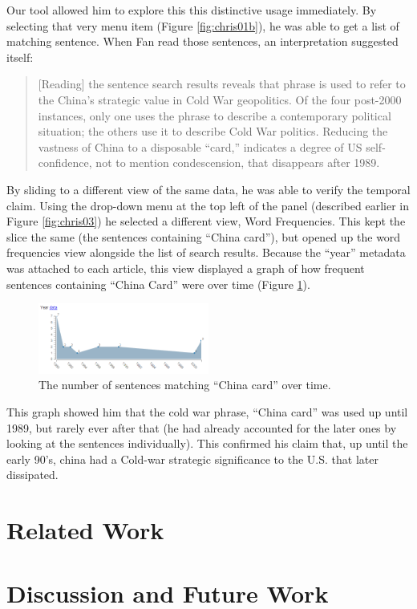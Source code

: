 \documentclass{sig-alternate}
\begin{document}
Our tool allowed him to explore this this distinctive usage immediately. By selecting that very menu item (Figure \ref{fig:chris01b}), he was able to get a list of matching sentence. When Fan read those sentences, an interpretation suggested itself:
\begin{quote}[Reading] the sentence search results reveals that phrase is used to refer to the China's strategic value in Cold War geopolitics. Of the four post-2000 instances, only one uses the phrase to describe a contemporary political situation; the others use it to describe Cold War politics. Reducing the vastness of China to a disposable ``card,'' indicates a degree of US self-confidence, not to mention condescension, that disappears after 1989.\end{quote}
By sliding to a different view of the same data, he was able to verify the temporal claim. Using the drop-down menu at the top left of the panel (described earlier in Figure \ref{fig:chris03}) he selected a different view, Word Frequencies. This kept the slice the same (the sentences containing ``China card''), but opened up the word frequencies view alongside the list of search results.  Because the ``year'' metadata was attached to each article, this view displayed a graph of how frequent  sentences containing ``China Card'' were over time (Figure \ref{fig:chris02}). 

\begin{figure}[h!]
\includegraphics[width=0.5\textwidth]{fig/chris/02.png}
\caption{ The number of sentences matching ``China card'' over time. \label{fig:chris02}}
\end{figure}
This graph showed him that the cold war phrase, ``China card'' was used up until 1989, but rarely ever after that (he had already accounted for the later ones by looking at the sentences individually). This confirmed his claim that, up until the early 90's, china had a Cold-war strategic significance to the U.S. that later dissipated.

\section {Related Work}

\section{Discussion and Future Work}
\end{document}
